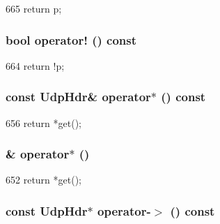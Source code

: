\begin{DoxyCode}
665 { return p; }
\end{DoxyCode}
\hypertarget{classNet_1_1UdpPtr_ac8b1d32dbd52d431450c70b151cfa205}{
\subsubsection[{operator!}]{\setlength{\rightskip}{0pt plus 5cm}bool operator! () const}}
\label{classNet_1_1UdpPtr_ac8b1d32dbd52d431450c70b151cfa205}



\begin{DoxyCode}
664 { return !p; }
\end{DoxyCode}
\hypertarget{classNet_1_1UdpPtr_aab2f2ca8ddd9aa479e1de4067e47a5fd}{
\subsubsection[{operator$\ast$}]{\setlength{\rightskip}{0pt plus 5cm}const {\bf UdpHdr}\& operator$\ast$ () const}}
\label{classNet_1_1UdpPtr_aab2f2ca8ddd9aa479e1de4067e47a5fd}



\begin{DoxyCode}
656 { return *get(); }
\end{DoxyCode}
\hypertarget{classNet_1_1UdpPtr_acef4258ce7955f5d7d8d10f79fd19825}{
\subsubsection[{operator$\ast$}]{\& operator$\ast$ ()}}
\label{classNet_1_1UdpPtr_acef4258ce7955f5d7d8d10f79fd19825}



\begin{DoxyCode}
652 { return *get(); }
\end{DoxyCode}
\hypertarget{classNet_1_1UdpPtr_ae6a408523ebfb6e70d224efab6193010}{
\subsubsection[{operator-\/$>$}]{\setlength{\rightskip}{0pt plus 5cm}const {\bf UdpHdr}$\ast$ operator-\/$>$ () const}}
\label{classNet_1_1UdpPtr_ae6a408523ebfb6e70d224efab6193010}



